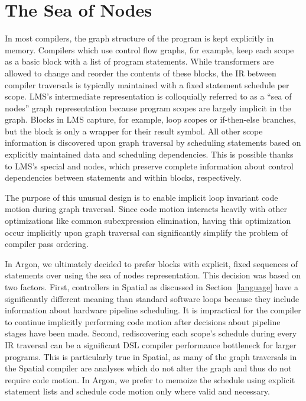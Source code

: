\section{The Sea of Nodes}
In most compilers, the graph structure of the program is kept explicitly in memory.
Compilers which use control flow graphs, for example, keep each scope as a
basic block with a list of program statements. While transformers are allowed
to change and reorder the contents of these blocks, the IR between compiler traversals is
typically maintained with a fixed statement schedule per scope.
LMS's intermediate representation is colloquially referred to as
a ``sea of nodes'' graph representation because program scopes are largely
implicit in the graph. Blocks in LMS capture, for example, loop scopes or
if-then-else branches, but the block is only a wrapper for their result symbol.
All other scope information is discovered upon graph traversal by scheduling
statements based on explicitly maintained data and scheduling dependencies.
This is possible thanks to LMS's special  and  nodes, which
preserve complete information about control dependencies between statements and
within blocks, respectively.

The purpose of this unusual design is to enable implicit loop invariant
code motion during graph traversal. Since code motion interacts heavily with
other optimizations like common subexpression elimination, having this
optimization occur implicitly upon graph traversal can significantly simplify
the problem of compiler pass ordering.

In Argon, we ultimately decided to prefer blocks with explicit, fixed sequences of
statements over using the sea of nodes representation. This decision was based on
two factors. First, controllers in Spatial as discussed in Section~\ref{language}
have a significantly different meaning than standard software loops because they
include information about hardware pipeline scheduling. It is
impractical for the compiler to continue implicitly performing code motion
after decisions about pipeline stages have been made. Second, rediscovering each
scope's schedule during every IR traversal can be a significant
DSL compiler performance bottleneck for larger programs. This is particularly true in
Spatial, as many of the graph traversals in the Spatial
compiler are analyses which do not alter the graph and thus do not require code motion.
In Argon, we prefer to memoize the
schedule using explicit statement lists and schedule code motion only where valid and necessary.

